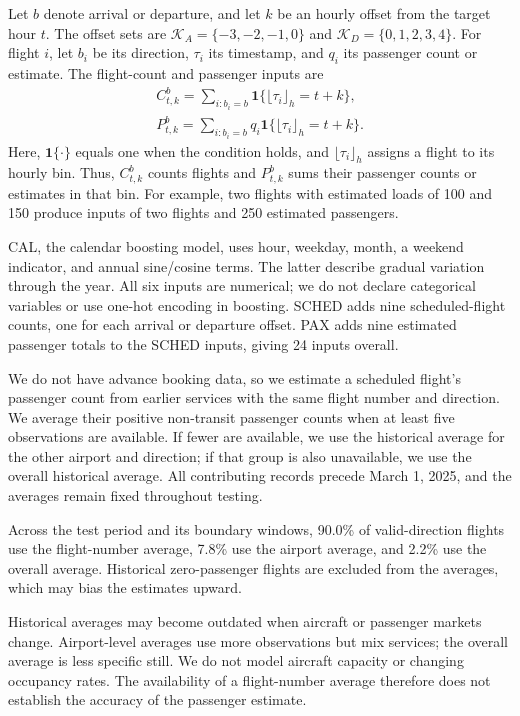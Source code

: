 \documentclass[preprint,12pt,times]{elsarticle}
\begin{document}
Let $b$ denote arrival or departure, and let $k$ be an hourly offset from the target hour $t$. The offset sets are $\mathcal K_A=\{-3,-2,-1,0\}$ and $\mathcal K_D=\{0,1,2,3,4\}$. For flight $i$, let $b_i$ be its direction, $\tau_i$ its timestamp, and $q_i$ its passenger count or estimate. The flight-count and passenger inputs are
\begin{align}
C^b_{t,k}=\sum_{i:b_i=b}\mathbf1\{\lfloor\tau_i\rfloor_h=t+k\},\\
P^b_{t,k}=\sum_{i:b_i=b}q_i\mathbf1\{\lfloor\tau_i\rfloor_h=t+k\}.
\end{align}
Here, $\mathbf1\{\cdot\}$ equals one when the condition holds, and $\lfloor\tau_i\rfloor_h$ assigns a flight to its hourly bin. Thus, $C^b_{t,k}$ counts flights and $P^b_{t,k}$ sums their passenger counts or estimates in that bin. For example, two flights with estimated loads of 100 and 150 produce inputs of two flights and 250 estimated passengers.

CAL, the calendar boosting model, uses hour, weekday, month, a weekend indicator, and annual sine/cosine terms. The latter describe gradual variation through the year. All six inputs are numerical; we do not declare categorical variables or use one-hot encoding in boosting. SCHED adds nine scheduled-flight counts, one for each arrival or departure offset. PAX adds nine estimated passenger totals to the SCHED inputs, giving 24 inputs overall.

We do not have advance booking data, so we estimate a scheduled flight's passenger count from earlier services with the same flight number and direction. We average their positive non-transit passenger counts when at least five observations are available. If fewer are available, we use the historical average for the other airport and direction; if that group is also unavailable, we use the overall historical average. All contributing records precede March 1, 2025, and the averages remain fixed throughout testing.

Across the test period and its boundary windows, 90.0\% of valid-direction flights use the flight-number average, 7.8\% use the airport average, and 2.2\% use the overall average. Historical zero-passenger flights are excluded from the averages, which may bias the estimates upward.

Historical averages may become outdated when aircraft or passenger markets change. Airport-level averages use more observations but mix services; the overall average is less specific still. We do not model aircraft capacity or changing occupancy rates. The availability of a flight-number average therefore does not establish the accuracy of the passenger estimate.
\end{document}
